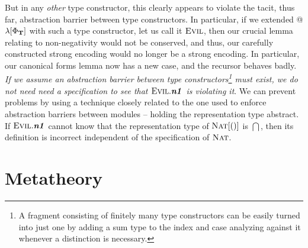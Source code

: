 \documentclass[9pt,preprint]{sigplanconf}
\begin{document}
But in any \emph{other} type constructor, this clearly appears to violate the tacit, thus far, abstraction barrier between type constructors. In particular, if we extended @$\lambda[\Phi_{\mathbf{T}}]$ with such a type constructor, let us call it $\textsc{Evil}$, then our crucial lemma relating to non-negativity would not be conserved, and thus, our carefully constructed strong encoding would no longer be a strong encoding. In particular, our canonical forms lemma now has a new case, and the recursor behaves badly. \emph{If we assume an abstraction barrier between type constructors\footnote{A fragment consisting of finitely many type constructors can be easily turned into just one by adding a sum type to the index and case analyzing against it whenever a distinction is necessary.} must exist, we do not need need a specification to see that $\textsc{Evil}.\textbf{\textit{n1}}$ is violating it}. We can prevent problems by using a technique closely related to the one used to enforce abstraction barriers between modules -- holding the representation type abstract. If $\textsc{Evil}.\textbf{\textit{n1}}$ cannot know that the representation type of $\textsc{Nat}[()]$ is $\dint$, then its definition is incorrect independent of the specification of $\textsc{Nat}$. 
\section{Metatheory}\label{theory}
\end{document}
